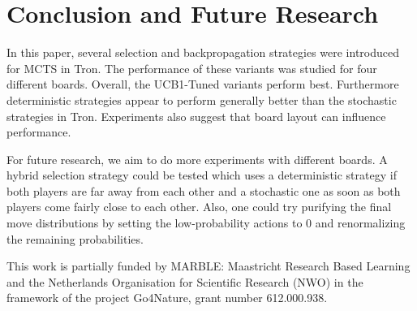 \documentclass{article}
\begin{document}
\section{Conclusion and Future Research}
\label{sec:conclusion}

In this paper, several selection and backpropagation strategies were introduced for MCTS in Tron.
The performance of these variants was studied for four different boards.
Overall, the UCB1-Tuned variants perform best. %
Furthermore deterministic strategies appear to perform generally better than the stochastic strategies in Tron.
Experiments also suggest that board layout can influence performance.

For future research, we aim to do more experiments with different boards. 
A hybrid selection strategy could be tested which uses a deterministic strategy if both players 
are far away from each other and a stochastic one as soon as both players come fairly close to each other. 
Also, one could try purifying the final move distributions by setting the low-probability actions to 0 and renormalizing 
the remaining probabilities. 

\vspace{0.2cm}
 {\small This work is partially funded by MARBLE: Maastricht
Research Based Learning and the Netherlands Organisation
for Scientific Research (NWO) in the framework of the project
Go4Nature, grant number 612.000.938. }

\vspace{-0.5cm}


\end{document}
